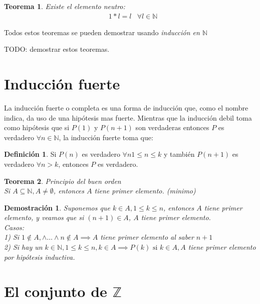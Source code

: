 \documentclass[9pt,a4paper]{article}
\theoremstyle{definition}
\newtheorem{defi}{Definición}
\theoremstyle{plain}
\newtheorem{teo}{Teorema}
\newtheorem{demo}{Demostración}[teo]
\begin{document}
\begin{teo} \label{teoelneu}Existe el elemento neutro:\\
\begin{align*} & 1*l=l & \forall l\in{\mathbb{N}} \end{align*}
\end{teo}

Todos estos teoremas se pueden demostrar usando {\itshape inducción en $\mathbb{N}$} 

TODO: demostrar estos teoremas.

\section{Inducción fuerte}

La inducción fuerte o completa es una forma de inducción que, como el nombre indica, da uso de una hipótesis mas fuerte. Mientras que la inducción debil toma como hipótesis que si $P(1)$ y $P(n+1)$ son verdaderas entonces $P$ es verdadero $\forall{n}\in{\mathbb{N}}$, la inducción fuerte toma que:\\

\begin{defi} Si $P(n)$ es verdadero $\forall{n} {1}\leq{n}\leq{k}$ y también $P(n+1)$ es verdadero $\forall n>k$, entonces $P$ es verdadero.\end{defi}

\begin{teo} Principio del buen orden\\

Si $A \subseteq \mathbb{N}, A \neq \emptyset$, entonces $A$ tiene primer elemento. (minimo)
\end{teo}

\begin{demo} Suponemos que $k\in{A}, {1}\leq{k}\leq{n}$, entonces $A$ tiene primer elemento, y veamos que si $(n+1)\in{A}$, $A$ tiene primer elemento.\\

Casos:\\
1) Si $1\notin{A}, \land \dots \land n\notin{A} \implies A$ tiene primer elemento al saber $n+1$\\
2) Si hay un $k\in{\mathbb{N}}, 1\leq{k}\leq{n}, k\in{A} \implies P(k)\text{ si } k\in{A}, A$ tiene primer elemento por hipótesis inductiva.
\end{demo}

\section{El conjunto de $\mathbb{Z}$}
\end{document}
